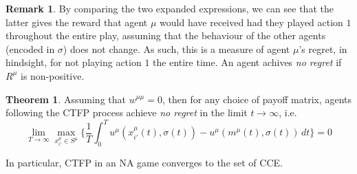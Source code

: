 \documentclass{article}
\theoremstyle{definition}
\newtheorem{theorem}{Theorem}
\newtheorem*{remark}{Remark}
\begin{document}
\begin{remark}
		By comparing the two expanded expressions, we can see that the latter gives the reward that agent $\mu$ would have received had they played action $1$ throughout the entire play, assuming that the behaviour of the other agents (encoded in $\sigma$) does not change. As such, this is a measure of agent $\mu$'s regret, in hindsight, for not playing action $1$ the entire time. An agent achives \emph{no regret} if $R^\mu$ is non-positive.
	\end{remark}



	\begin{theorem}
		Assuming that $w^{\mu \mu} = 0$, then for any choice of payoff matrix, agents following the
		CTFP process achieve \emph{no regret} in the limit $t \rightarrow \infty$, i.e.
		\begin{equation}
			\lim_{T \rightarrow \infty} \max_{x_{i'}^\mu \in S^\mu} \Big\{ \frac{1}{T} \int_{0}^{T} u^{\mu}(x_{i'}^\mu(t), \sigma(t)) - u^{\mu}(m^\mu(t), \sigma(t)) \, dt \Big\} = 0
		\end{equation}

		In particular, CTFP in an NA game converges to the set of CCE.

	\end{theorem}
	
\end{document}
